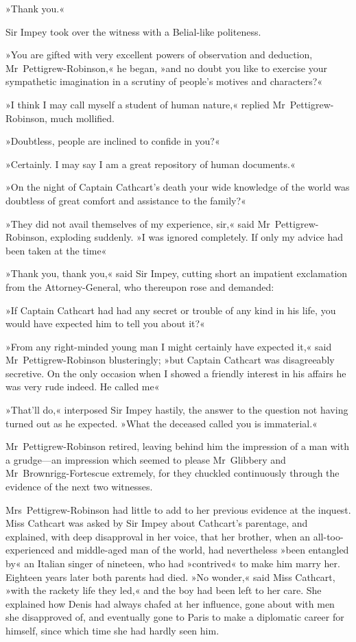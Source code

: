»Thank you.«

Sir Impey took over the witness with a Belial-like politeness.

»You are gifted with very excellent powers of observation and deduction, Mr~Pettigrew-Robinson,« he began, »and no doubt you like to exercise your sympathetic imagination in a scrutiny of people's motives and characters?«

»I think I may call myself a student of human nature,« replied Mr~Pettigrew-Robinson, much mollified.

»Doubtless, people are inclined to confide in you?«

»Certainly. I may say I am a great repository of human documents.«

»On the night of Captain Cathcart's death your wide knowledge of the world was doubtless of great comfort and assistance to the family?«

»They did not avail themselves of my experience, sir,« said Mr~Pettigrew-Robinson, exploding suddenly. »I was ignored completely. If only my advice had been taken at the time\longdash«

»Thank you, thank you,« said Sir Impey, cutting short an impatient exclamation from the Attorney-General, who thereupon rose and demanded:

»If Captain Cathcart had had any secret or trouble of any kind in his life, you would have expected him to tell you about it?«

»From any right-minded young man I might certainly have expected it,« said Mr~Pettigrew-Robinson blusteringly; »but Captain Cathcart was disagreeably secretive. On the only occasion when I showed a friendly interest in his affairs he was very rude indeed. He called me\longdash«

»That'll do,« interposed Sir Impey hastily, the answer to the question not having turned out as he expected. »What the deceased called you is immaterial.«

Mr~Pettigrew-Robinson retired, leaving behind him the impression of a man with a grudge—an impression which seemed to please Mr~Glibbery and Mr~Brownrigg-Fortescue extremely, for they chuckled continuously through the evidence of the next two witnesses.

Mrs~Pettigrew-Robinson had little to add to her previous evidence at the inquest. Miss Cathcart was asked by Sir Impey about Cathcart's parentage, and explained, with deep disapproval in her voice, that her brother, when an all-too-experienced and middle-aged man of the world, had nevertheless »been entangled by« an Italian singer of nineteen, who had »contrived« to make him marry her. Eighteen years later both parents had died. »No wonder,« said Miss Cathcart, »with the rackety life they led,« and the boy had been left to her care. She explained how Denis had always chafed at her influence, gone about with men she disapproved of, and eventually gone to Paris to make a diplomatic career for himself, since which time she had hardly seen him.


